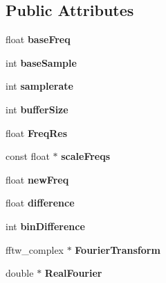 \subsection*{Public Attributes}
\begin{DoxyCompactItemize}
\item 
\hypertarget{classvocoder_aafcdc7b5f6784b3b55f7c964211c1329}{float {\bfseries base\-Freq}}\label{classvocoder_aafcdc7b5f6784b3b55f7c964211c1329}

\item 
\hypertarget{classvocoder_ab5c7dbce120b438d5a3f60771e8b359e}{int {\bfseries base\-Sample}}\label{classvocoder_ab5c7dbce120b438d5a3f60771e8b359e}

\item 
\hypertarget{classvocoder_a1cc2c8e543b6bdcb79634bff13bf23fd}{int {\bfseries samplerate}}\label{classvocoder_a1cc2c8e543b6bdcb79634bff13bf23fd}

\item 
\hypertarget{classvocoder_a33f8486a4d2962a9f28a855cb7a55e5d}{int {\bfseries buffer\-Size}}\label{classvocoder_a33f8486a4d2962a9f28a855cb7a55e5d}

\item 
\hypertarget{classvocoder_a7e4963de3417d77dd67b5d2d4098b4bf}{float {\bfseries Freq\-Res}}\label{classvocoder_a7e4963de3417d77dd67b5d2d4098b4bf}

\item 
\hypertarget{classvocoder_ae08ca4fc0d5b20a84ebe720adf9e1906}{const float $\ast$ {\bfseries scale\-Freqs}}\label{classvocoder_ae08ca4fc0d5b20a84ebe720adf9e1906}

\item 
\hypertarget{classvocoder_aeb2b2f60f0f665a0ada7432a698e8cbb}{float {\bfseries new\-Freq}}\label{classvocoder_aeb2b2f60f0f665a0ada7432a698e8cbb}

\item 
\hypertarget{classvocoder_a3e465de83503fc072b5877cc370b9158}{float {\bfseries difference}}\label{classvocoder_a3e465de83503fc072b5877cc370b9158}

\item 
\hypertarget{classvocoder_ae82a9e8adea02301434f03ac01c61720}{int {\bfseries bin\-Difference}}\label{classvocoder_ae82a9e8adea02301434f03ac01c61720}

\item 
\hypertarget{classvocoder_ac249f700b1708bf7cd07e01b705a2426}{fftw\-\_\-complex $\ast$ {\bfseries Fourier\-Transform}}\label{classvocoder_ac249f700b1708bf7cd07e01b705a2426}

\item 
\hypertarget{classvocoder_aa7b3406cd1595cc8b23c34a4364bde4d}{double $\ast$ {\bfseries Real\-Fourier}}\label{classvocoder_aa7b3406cd1595cc8b23c34a4364bde4d}

\end{DoxyCompactItemize}


